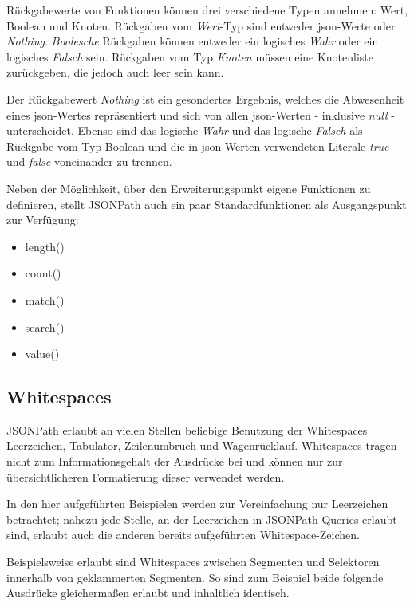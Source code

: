 \documentclass[oneside]{ausarbeitung}
\begin{document}
Rückgabewerte von Funktionen können drei verschiedene Typen annehmen: Wert, Boolean und Knoten. Rückgaben vom \textit{Wert}-Typ sind entweder \ac{json}-Werte oder \textit{Nothing}. \textit{Boolesche} Rückgaben können entweder ein logisches \textit{Wahr} oder ein logisches \textit{Falsch} sein. Rückgaben vom Typ \textit{Knoten} müssen eine Knotenliste zurückgeben, die jedoch auch leer sein kann.

Der Rückgabewert \textit{Nothing} ist ein gesondertes Ergebnis, welches die Abwesenheit eines \ac{json}-Wertes repräsentiert und sich von allen \ac{json}-Werten - inklusive \textit{null} -  unterscheidet. Ebenso sind das logische \textit{Wahr} und das logische \textit{Falsch} als Rückgabe vom Typ Boolean und die in \ac{json}-Werten verwendeten Literale \textit{true} und \textit{false} voneinander zu trennen.

Neben der Möglichkeit, über den Erweiterungspunkt eigene Funktionen zu definieren, stellt JSONPath auch ein paar Standardfunktionen als Ausgangspunkt zur Verfügung:

\begin{itemize}
\item length()
\item count()
\item match()
\item search()
\item value()
\end{itemize}



	
\subsection{Whitespaces}
	
JSONPath erlaubt an vielen Stellen beliebige Benutzung der Whitespaces Leerzeichen, Tabulator, Zeilenumbruch und Wagenrücklauf. Whitespaces tragen nicht zum Informationsgehalt der Ausdrücke bei und können nur zur übersichtlicheren Formatierung dieser verwendet werden. 
	
In den hier aufgeführten Beispielen werden zur Vereinfachung nur Leerzeichen betrachtet; nahezu jede Stelle, an der Leerzeichen in JSONPath-Queries erlaubt sind, erlaubt auch die anderen bereits aufgeführten Whitespace-Zeichen.
	
Beispielsweise erlaubt sind Whitespaces zwischen Segmenten und Selektoren innerhalb von geklammerten Segmenten. So sind zum Beispiel beide folgende Ausdrücke gleichermaßen erlaubt und inhaltlich identisch.
	
\end{document}
